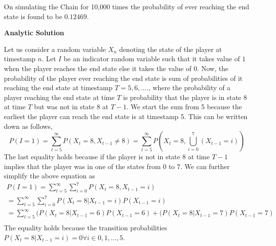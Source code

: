 \documentclass{article}
\begin{document}
\begin{enumerate}
	    \noindent %
        On simulating the Chain for 10,000 times the probability of ever reaching the end state is found to be $0.12469$.

        \textbf{Analytic Solution} \par
	
	    \noindent %
        Let us consider a random variable $X_{n}$ denoting the state of the player at timestamp $n$. Let $I$ be an indicator random 
        variable such that it takes value of $1$ when the player reaches the end state else it takes the value of $0$. Now, the 
        probability of the player ever reaching the end state is sum of probabilities of it reaching the end state at timestamp 
        $T=5, 6, .... $, where the probability of a player reaching the end state at time $T$ is probability that the player is in state
        8 at time $T$ but was not in state 8 at $T-1$. We start the sum from 5 because the earliest the player can reach the end state is 
        at timestamp 5. This can be written down as follows,
        \begin{equation}
        \nonumber
            P(I = 1) = \sum_{t=5}^{\infty} P(X_{t} = 8, X_{t-1} \neq 8) = \sum_{t=5}^{\infty} P\left (X_{t} = 8, \bigcup_{i=0}^{7} (X_{t-1} = i) \right )
        \end{equation}
        The last equality holds because if the player is not in state 8 at time $T-1$ implies that the player was in one of the states 
        from $0$ to $7$. We can 
        further simplify the above equation as
        \begin{equation}
        \nonumber
        \begin{gathered}
            P(I = 1) = \sum_{t=5}^{\infty} \sum_{i=0}^{7} P(X_{t} = 8, X_{t-1} = i)\\
                     = \sum_{t=5}^{\infty} \sum_{i=0}^{7} P(X_{t} = 8 | X_{t-1} = i)P(X_{t-1} = i) \\
                     = \sum_{t=5}^{\infty} (P(X_{t} = 8 | X_{t-1} = 6)P(X_{t-1} = 6) +  (P(X_{t} = 8 | X_{t-1} = 7)P(X_{t-1} = 7)\\
        \end{gathered}
        \end{equation}
        The equality holds because the transition probabilities $P(X_{t} = 8 | X_{t-1} = i) = 0 \forall i \in {0,1,...,5}$.
\end{enumerate}
\end{document}
